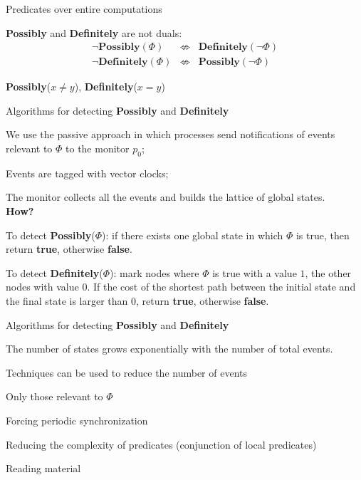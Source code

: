 \begin{frame}{Predicates over entire computations}

\begin{theorem}
{\bf Possibly} and {\bf Definitely} are not duals:
\begin{eqnarray*}
\neg \mathbf{Possibly}(\Phi) &\not\Leftrightarrow& \mathbf{Definitely}(\neg \Phi) \\
\neg \mathbf{Definitely}(\Phi) &\not\Leftrightarrow& \mathbf{Possibly}(\neg \Phi)
\end{eqnarray*}
\end{theorem}

\bigskip
\begin{example}
{\bf Possibly}($x \neq y$), {\bf Definitely}($x=y$)
\end{example}

\end{frame}

\begin{frame}{Algorithms for detecting {\bf Possibly} and {\bf Definitely}}

\BI
\item We use the passive approach in which processes send notifications of events 
  relevant to $\Phi$ to the monitor $p_0$;
\item Events are tagged with vector clocks; 
\item The monitor collects all the events and builds the lattice of global
  states.\\
  {\bf How?}
\item To detect {\bf Possibly}($\Phi$): if there exists one 
  global state in which $\Phi$ is true, then return {\bf true}, otherwise
  {\bf false}.
\item To detect {\bf Definitely}($\Phi$): mark nodes where $\Phi$ is true
  with a value $1$, the other nodes with value $0$. If the cost of the 
  shortest path between the initial state and the final state is larger
  than $0$, return {\bf true}, otherwise
  {\bf false}.
\EI

\end{frame}

\begin{frame}{Algorithms for detecting {\bf Possibly} and {\bf Definitely}}

\BIL
\item The number of states grows exponentially with the number of total
  events. 
\item Techniques can be used to reduce the number of events
\BI
\item Only those relevant to $\Phi$
\item Forcing periodic synchronization
\item Reducing the complexity of predicates (conjunction of local predicates)
\EI
\EIL

\end{frame}

\nocite{ozalp93consistent}

\begin{frame}{Reading material}

{\footnotesize

  
}

\end{frame}




